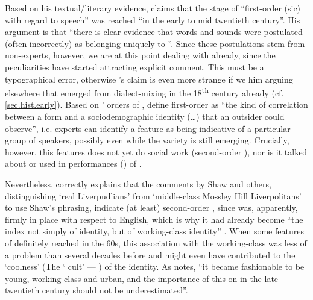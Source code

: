 Based on his textual/literary evidence, \citet[107]{crowley2012} claims that the stage of ``first-order (sic)  with regard to  speech'' was reached ``in the early to mid twentieth century''.
His argument is that ``there is clear evidence that words and sounds were postulated (often incorrectly) as belonging uniquely to ''.
Since these postulations stem from non-experts, however, we are at this point dealing with  already, since the peculiarities have started attracting explicit comment.
This must be a typographical error, otherwise \citeauthor{crowley2012}'s claim is even more strange if we  him arguing elsewhere that  emerged from dialect-mixing in the 18\textsuperscript{th} century already (cf. \ref{sec.hist.early}).
Based on \citeauthor{silverstein2003}' \citeyear{silverstein2003} orders of , \textcite[81]{johnstoneetal2006} define first-order  as ``the kind of correlation between a form and a sociodemographic identity (\ldots) that an outsider could observe'', i.e. experts can identify a feature as being indicative of a particular group of speakers, possibly even while the variety is still emerging.
Crucially, however, this features does not yet do social work (second-order ), nor is it talked about or used in  performances () of  \parencite[cf.][83--84]{johnstoneetal2006}.

Nevertheless, \citeauthor{crowley2012} correctly explains that the comments by Shaw and others, distinguishing `real Liverpudlians' from `middle-class Mossley Hill Liverpolitans' to use Shaw's phrasing, indicate (at least) second-order , since  was, apparently, firmly in place with respect to  English, which is why it had already become ``the index not simply of  identity, but of  working-class identity'' \citep[107]{crowley2012}.
When some features of  definitely reached  in the 60s, this association with the working-class was less of a problem than several decades before and might even have contributed to the `coolness' (The ` cult' --- \citealt[109]{crowley2012}) of the  identity.
As \citet[165]{wales2006} notes, ``it became fashionable to be young, working class and urban, and the importance of this on  in the late twentieth century should not be underestimated''.


